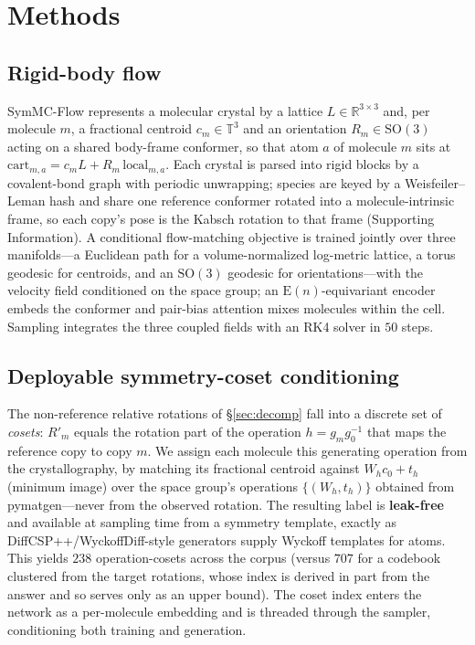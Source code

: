\documentclass[journal=acsodf,manuscript=article]{achemso}
\begin{document}
\section{Methods}
\subsection{Rigid-body flow}
SymMC-Flow represents a molecular crystal by a lattice $L\in\mathbb{R}^{3\times3}$
and, per molecule $m$, a fractional centroid $c_m\in\mathbb{T}^3$ and an
orientation $R_m\in\mathrm{SO}(3)$ acting on a shared body-frame conformer, so that
atom $a$ of molecule $m$ sits at
$\text{cart}_{m,a}=c_mL+R_m\,\text{local}_{m,a}$. Each crystal is parsed into rigid
blocks by a covalent-bond graph with periodic unwrapping; species are keyed by a
Weisfeiler--Leman hash and share one reference conformer rotated into a
molecule-intrinsic frame, so each copy's pose is the Kabsch rotation to that frame
(Supporting Information). A conditional flow-matching
objective\cite{lipman2023flowmatching} is trained jointly over three manifolds---a
Euclidean path for a volume-normalized log-metric lattice, a torus geodesic for
centroids, and an $\mathrm{SO}(3)$ geodesic for orientations---with the velocity
field conditioned on the space group; an $\mathrm{E}(n)$-equivariant
encoder\cite{satorras2021egnn} embeds the conformer and pair-bias attention mixes
molecules within the cell. Sampling integrates the three coupled fields with an
RK4 solver in $50$ steps.

\subsection{Deployable symmetry-coset conditioning}\label{sec:coset}
The non-reference relative rotations of \S\ref{sec:decomp} fall into a discrete set
of \emph{cosets}: $R'_m$ equals the rotation part of the operation $h=g_mg_0^{-1}$
that maps the reference copy to copy $m$. We assign each molecule this generating
operation from the crystallography, by matching its fractional centroid against
$W_hc_0+t_h$ (minimum image) over the space group's operations $\{(W_h,t_h)\}$
obtained from pymatgen---never from the observed rotation. The resulting label is
\textbf{leak-free} and available at sampling time from a symmetry template, exactly
as DiffCSP++/WyckoffDiff-style generators supply Wyckoff templates for
atoms\cite{jiao2024diffcsppp,wyckoffdiff2025}. This yields $238$ operation-cosets
across the corpus (versus $707$ for a codebook clustered from the target rotations,
whose index is derived in part from the answer and so serves only as an upper
bound). The coset index enters the network as a per-molecule embedding and is
threaded through the sampler, conditioning both training and generation.
\end{document}
